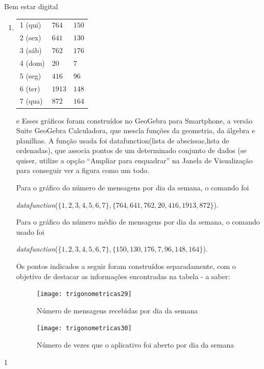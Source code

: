 \begin{answer}{Bem estar digital}
{
\begin{enumerate}[left=7.5pt, wide]
\item {}
{
\scalebox{.9}
{
\begin{tabular}{|e{.3\linewidth}|e{.3\linewidth}|e{.3\linewidth}|}
\hline
{} &  &  \tabularnewline
{} (qui) & $764$ & $150$ \tabularnewline
{} (sex) & $641$ & $130$ \tabularnewline
{} (sáb) & $762$ & $176$ \tabularnewline
{} (dom) & $20$ & $7$ \tabularnewline
{} (seg) & $416$ & $96$ \tabularnewline
{} (ter) & $1913$ & $148$ \tabularnewline
{} (qua) & $872$ & $164$ \tabularnewline
\hline
\end{tabular}
}
}
\item [\titem{b)} e \titem{c)}] Esses gráficos foram construídos no GeoGebra para Smartphone, a versão Suite GeoGebra
Calculadora, que mescla funções da geometria, da álgebra e planilhas. A função usada foi datafunction({lista de abscissas},{lista de ordenadas}), que associa pontos de um determinado conjunto de dados (se quiser, utilize a opção “Ampliar para enquadrar”{} na Janela de Visualização para conseguir ver a figura como um todo. 

Para o gráfico do número de mensagens por dia da semana, o comando foi 
\begin{center}
\textit{datafunction}($\{1, 2, 3, 4, 5, 6, 7\}, \{764, 641, 762, 20, 416,1913, 872\}$). 
\end{center}
Para o  gráfico do número médio de mensagens por dia da semana, o comando usado foi 
\begin{center}
\textit{datafunction}($\{1, 2, 3, 4, 5, 6, 7\}, \{150, 130, 176, 7, 96, 148, 164\}$).
\end{center}
 Os pontos indicados a seguir foram construídos separadamente, com o objetivo de destacar as informações encontradas na tabela - a saber:
\begin{multicols}{2}
\begin{figure}[H]
\centering
\texttt{[image: trigonometricas29]}

\caption{Número de mensagens
recebidas por dia da semana}
\label{}
\end{figure}
\begin{figure}[H]
\centering
\texttt{[image: trigonometricas30]}
\caption{Número de vezes que o
aplicativo foi aberto por dia da semana}
\label{}
\end{figure}
\end{multicols}
\end{enumerate}
}{1}
\end{answer}
